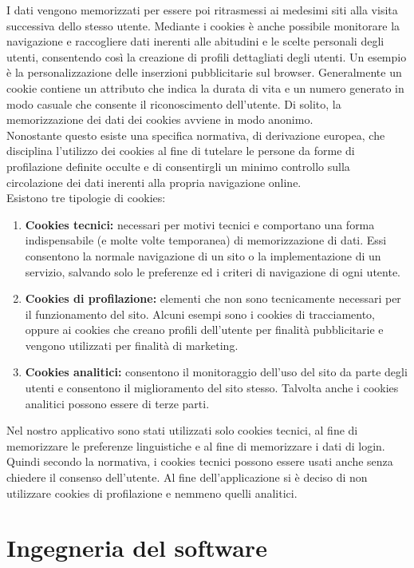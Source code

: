 \documentclass[a4paper,final,12pt]{report}
\begin{document}
I dati vengono memorizzati per essere poi ritrasmessi ai medesimi siti alla visita successiva dello stesso utente. Mediante i cookies è anche possibile monitorare la navigazione e raccogliere dati inerenti alle abitudini e le scelte personali degli utenti, consentendo così la creazione di profili dettagliati degli utenti. Un esempio è la personalizzazione delle inserzioni pubblicitarie sul browser. Generalmente un cookie contiene un attributo che indica la durata di vita e un numero
generato in modo casuale che consente il riconoscimento dell'utente. Di solito, la memorizzazione dei dati dei cookies avviene in modo anonimo.\\
Nonostante questo esiste una specifica normativa, di derivazione europea, che disciplina l'utilizzo
dei cookies al fine di tutelare le persone da forme di profilazione definite occulte e di consentirgli
un minimo controllo sulla circolazione dei dati inerenti alla propria navigazione online.\\
Esistono tre tipologie di cookies:
\begin{enumerate}
\item \textbf{Cookies tecnici:} necessari per motivi tecnici e comportano una forma indispensabile (e molte volte temporanea) di memorizzazione di dati. Essi consentono la normale navigazione di un sito o la implementazione di un servizio, salvando solo le preferenze ed i criteri di navigazione di ogni utente.
\item \textbf{Cookies di profilazione:} elementi che non sono tecnicamente necessari per il funzionamento del sito. Alcuni esempi sono i cookies di tracciamento, oppure ai cookies che creano profili dell'utente per finalità pubblicitarie e vengono utilizzati per finalità di marketing.
\item \textbf{Cookies analitici:} consentono il monitoraggio dell'uso del sito da parte degli utenti e consentono il miglioramento del sito stesso. Talvolta anche i cookies analitici possono essere di terze parti.
\end{enumerate}

Nel nostro applicativo sono stati utilizzati solo cookies tecnici, al fine di memorizzare le preferenze linguistiche e al fine di memorizzare i dati di login. Quindi secondo la normativa, i cookies tecnici possono essere usati anche senza chiedere il consenso dell'utente. Al fine dell'applicazione si è deciso di non utilizzare cookies di profilazione e nemmeno quelli analitici.

\section{Ingegneria del software}
\end{document}
